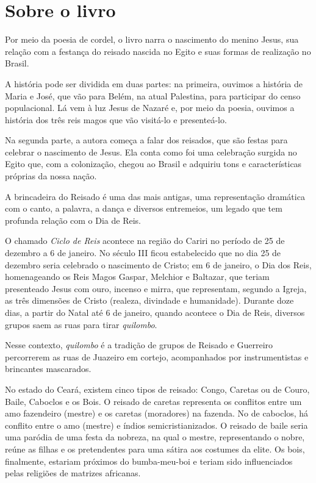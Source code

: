\documentclass[11pt]{extarticle}
\begin{document}
\section{Sobre o livro}
Por meio da poesia de cordel, o livro narra o nascimento do menino Jesus, sua relação com a festança do reisado nascida no Egito e suas formas de realização no Brasil.

A história pode ser dividida em duas partes: na primeira, ouvimos a história de Maria e José, que vão para Belém, na atual Palestina, para participar do censo populacional. Lá vem à luz Jesus de Nazaré e, por meio da poesia, ouvimos a história dos três reis magos que vão visitá-lo e presenteá-lo.

Na segunda parte, a autora começa a falar dos reisados, que são festas para celebrar o nascimento de Jesus. Ela conta como foi uma celebração surgida no Egito que, com a colonização, chegou ao Brasil e adquiriu tons e características próprias da nossa nação.

A brincadeira do Reisado é uma das mais antigas, uma representação dramática com o canto, a palavra, a dança e diversos entremeios, um legado que tem profunda relação com o Dia de Reis.

O chamado \textit{Ciclo de Reis} acontece na região do Cariri no período de 25 de dezembro a 6 de janeiro. No século III ficou estabelecido que no dia 25 de dezembro seria celebrado o nascimento de Cristo; em 6 de janeiro, o Dia dos Reis, homenageando os Reis Magos Gaspar, Melchior e Baltazar, que teriam presenteado Jesus com ouro, incenso e mirra, que representam, segundo a Igreja, as três dimensões de Cristo (realeza, divindade e humanidade). Durante doze dias, a partir do Natal até 6 de janeiro, quando acontece o Dia de Reis, diversos grupos saem as ruas para tirar \textit{quilombo}. 

Nesse contexto, \textit{quilombo} é a tradição de grupos de Reisado e Guerreiro percorrerem as ruas de Juazeiro em cortejo, acompanhados por instrumentistas e brincantes mascarados. 

No estado do Ceará, existem cinco tipos de reisado: Congo, Caretas ou de Couro, Baile, Caboclos e os Bois. O reisado de caretas representa os conflitos entre um amo fazendeiro (mestre) e os caretas (moradores) na fazenda. No de caboclos, há conflito entre o amo (mestre) e índios semicristianizados. O reisado de baile seria uma paródia de uma festa da nobreza, na qual o mestre, representando o nobre, reúne as filhas e os pretendentes para uma sátira aos costumes da elite. Os bois, finalmente, estariam próximos do bumba-meu-boi e teriam sido influenciados pelas religiões de matrizes africanas. 
\end{document}
